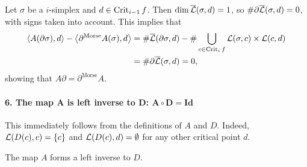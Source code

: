 \begin{myproof}
    Let $\sigma$ be a  $i$-simplex and $d \in \operatorname{Crit}_{i-1} f$.
    Then $\dim \overline{\mathcal L}(\sigma, d) = 1$, so  $\# \partial \overline{\mathcal L}(\sigma, d) = 0$, with signs taken into account.
    This implies that
    \begin{align*}
        \left<A(\partial \sigma), d \right> - \left<\partial^{\text{Morse}} A (\sigma) ,d\right> &= \# \overline{\mathcal L}(\partial \sigma, d) - \# \bigcup_{c \in  \operatorname{Crit}_i f} \mathcal L(\sigma, c) \times  \mathcal L(c, d)\\
                                                                                                 &= \# \partial \overline{\mathcal L}(\sigma, d) = 0
    ,\end{align*} 
    showing that $A \partial = \partial^{\text{Morse}} A$.


\paragraph{6. The map $\bm{A}$ is left inverse to $\bm{D}$: $\bm{A  \circ D = \text{Id}}$}
    This immediately follows from the definitions of $A$ and $D$.
    Indeed, $\mathcal L(D(c), c) = \{c\}$ and $\mathcal L(D(c), d) = \emptyset$ for any other critical point $d$.
\begin{marginfigure}
    \centering
    \caption{The map $A$ forms a left inverse to $D$.}
    \label{fig:a-is-left-inverse-to-d}
\end{marginfigure}



\end{myproof}
